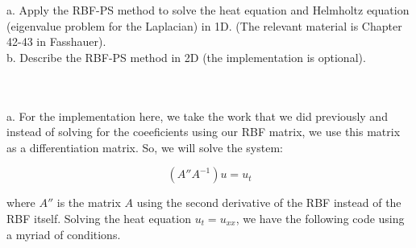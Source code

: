 a. Apply the RBF-PS method to solve the heat equation and Helmholtz equation (eigenvalue problem for the
Laplacian) in 1D. (The relevant material is Chapter 42-43 in Fasshauer).\\

b. Describe the RBF-PS method in 2D (the implementation is optional).\\\\

\begin{solution}\renewcommand{\qedsymbol}{}\ \\

    a. For the implementation here, we take the work that we did previously and instead of solving for
    the coeeficients using our RBF matrix, we use this matrix as a differentiation matrix. So, we will
    solve the system:
    
    $$(A'' A^{-1})u=u_t$$
    
    where $A''$ is the matrix $A$ using the second derivative of the RBF instead of the RBF itself.
    Solving the heat equation $u_t=u_{xx}$, we have the following code using a myriad of conditions.
    

\end{solution}
